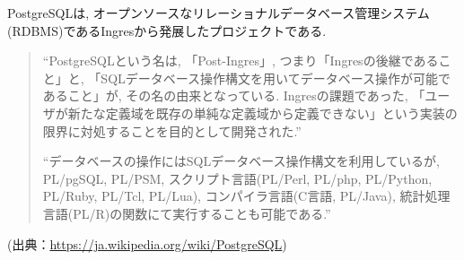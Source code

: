 PostgreSQLは, オープンソースなリレーショナルデータベース管理システム(RDBMS)であるIngresから発展したプロジェクトである.

\begin{quotation}
\begin{screen}
“PostgreSQLという名は, 「Post-Ingres」, つまり「Ingresの後継であること」と, 「SQLデータベース操作構文を用いてデータベース操作が可能であること」が, その名の由来となっている.
Ingresの課題であった, 「ユーザが新たな定義域を既存の単純な定義域から定義できない」という実装の限界に対処することを目的として開発された.”

“データベースの操作にはSQLデータベース操作構文を利用しているが, PL/pgSQL, PL/PSM, スクリプト言語(PL/Perl, PL/php, PL/Python, PL/Ruby, PL/Tcl, PL/Lua), コンパイラ言語(C言語, PL/Java), 統計処理言語(PL/R)の関数にて実行することも可能である.”
\end{screen}
\end{quotation}
\begin{flushright}
(出典：\url{https://ja.wikipedia.org/wiki/PostgreSQL})
\end{flushright}

